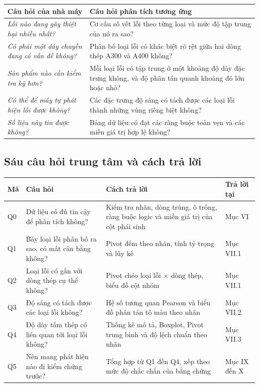 \documentclass[12pt]{article}
\begin{document}
\begin{center}
\small
\begin{tabular}{@{}p{7.4cm} p{8.6cm}@{}}
\toprule
\textbf{Câu hỏi của nhà máy} & \textbf{Câu hỏi phân tích tương ứng} \\
\midrule
\emph{Lỗi nào đang gây thiệt hại nhiều nhất?} & Cơ cấu số vết lỗi theo từng loại và mức độ tập trung của nó ra sao? \\
\addlinespace[3pt]
\emph{Có phải một dây chuyền đang có vấn đề không?} & Phân bố loại lỗi có khác biệt rõ rệt giữa hai dòng thép A300 và A400 không? \\
\addlinespace[3pt]
\emph{Sản phẩm nào cần kiểm tra kỹ hơn?} & Mỗi loại lỗi có tập trung ở một khoảng độ dày đặc trưng không, và độ phân tán quanh khoảng đó lớn hoặc nhỏ? \\
\addlinespace[3pt]
\emph{Có thể để máy tự phát hiện lỗi được không?} & Các đặc trưng độ sáng có tách được các loại lỗi thành những vùng riêng biệt không? \\
\addlinespace[3pt]
\emph{Số liệu này tin được không?} & Bảng dữ liệu có đạt các ràng buộc toàn vẹn và các miền giá trị hợp lệ không? \\
\bottomrule
\end{tabular}
\end{center}

\subsection{Sáu câu hỏi trung tâm và cách trả lời}

\begin{center}
\small
\begin{tabular}{@{}p{0.8cm} p{5.3cm} p{5.6cm} p{3.6cm}@{}}
\toprule
\textbf{Mã} & \textbf{Câu hỏi} & \textbf{Cách trả lời} & \textbf{Trả lời tại} \\
\midrule
Q0 & Dữ liệu có đủ tin cậy để phân tích không? & Kiểm tra nhãn, dòng trùng, ô trống, ràng buộc logic và miền giá trị của cột phái sinh & Mục VI \\
\addlinespace[3pt]
Q1 & Bảy loại lỗi phân bố ra sao, có mất cân bằng không? & Pivot đếm theo nhãn, tính tỷ trọng và lũy kế & Mục VII.1 \\
\addlinespace[3pt]
Q2 & Loại lỗi có gắn với dòng thép cụ thể không? & Pivot chéo loại lỗi $\times$ dòng thép, biểu đồ cột nhóm & Mục VII.1 \\
\addlinespace[3pt]
Q3 & Độ sáng có tách được các loại lỗi không? & Hệ số tương quan Pearson và biểu đồ phân tán tô màu theo nhãn & Mục VII.2 \\
\addlinespace[3pt]
Q4 & Độ dày tấm thép có liên quan tới loại lỗi không? & Thống kê mô tả, Boxplot, Pivot trung bình và độ lệch chuẩn theo nhãn & Mục VII.3 \\
\addlinespace[3pt]
Q5 & Nên mang phát hiện nào đi kiểm chứng trước? & Tổng hợp từ Q1 đến Q4, xếp theo mức độ chắc chắn của bằng chứng & Mục IX đến X \\
\bottomrule
\end{tabular}
\end{center}
\end{document}
